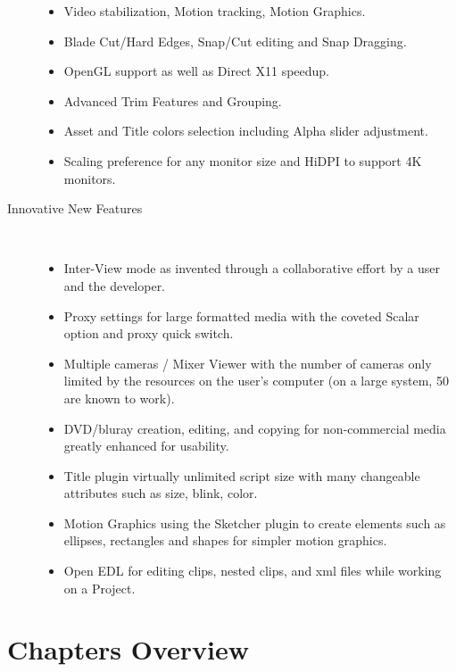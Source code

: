 \begin{description}
\begin{itemize}
                \item Video stabilization, Motion tracking, Motion Graphics.
                \item Blade Cut/Hard Edges, Snap/Cut editing and Snap Dragging.
                \item OpenGL support as well as Direct X11 speedup.
                \item Advanced Trim Features and Grouping.
                \item Asset and Title colors selection including Alpha slider adjustment.
                \item Scaling preference for any monitor size and HiDPI to support 4K monitors.
            \end{itemize}
            \item[Innovative New Features]~\\
                \begin{itemize}
                    \item Inter-View mode as invented through a collaborative effort by a user and the developer.
                    \item Proxy settings for large formatted media with the coveted Scalar option and proxy quick switch.
                    \item Multiple cameras / Mixer Viewer with the number of cameras only limited by the resources on the user’s computer (on a large system, 50 are known to work).
                    \item DVD/bluray creation, editing, and copying for non-commercial media greatly enhanced for usability.
                    \item Title plugin virtually unlimited script size with many changeable attributes such as size, blink, color.
                    \item Motion Graphics using the Sketcher plugin to create elements such as ellipses, rectangles and shapes for simpler motion graphics.
                    \item Open EDL for editing clips, nested clips, and xml files while working on a Project.
                \end{itemize}
\end{description}

\section*{Chapters Overview}%
\label{sec:chapters_overview}


